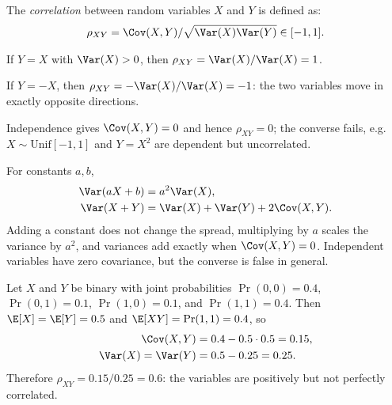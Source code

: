\documentclass[a4paper, 12pt]{book}
\begin{document}
\begin{definition}
    The \emph{correlation} between random variables $X$ and $Y$ is defined as:\begin{align}
    \rho_{XY} = \Cov(X,Y)/\sqrt{\Var(X)\Var(Y)} \in [-1,1].
\end{align}
\end{definition}
\begin{example}
    If $Y=X$ with $\Var(X)>0$, then $\rho_{XY}=\Var(X)/\Var(X)=1$.
\end{example}

\begin{example}
    If $Y=-X$, then $\rho_{XY}=-\Var(X)/\Var(X)=-1$: the two variables move in exactly opposite directions.
\end{example}

\begin{example}
    Independence gives $\Cov(X,Y)=0$ and hence $\rho_{XY}=0$; the converse fails, e.g.\ $X\sim\mathrm{Unif}[-1,1]$ and $Y=X^2$ are dependent but uncorrelated.
\end{example}

\begin{example}
    For constants $a,b$,
    \begin{align}
        \Var(aX+b) &= a^2\Var(X),\\
        \Var(X+Y) &= \Var(X)+\Var(Y)+2\Cov(X,Y).
    \end{align}
    Adding a constant does not change the spread, multiplying by $a$ scales the variance by $a^2$, and variances add exactly when $\Cov(X,Y)=0$. Independent
    variables have zero covariance, but the converse is false in general.
\end{example}

\begin{example}
    Let $X$ and $Y$ be binary with joint probabilities
    $\Pr(0,0)=0.4$, $\Pr(0,1)=0.1$, $\Pr(1,0)=0.1$, and $\Pr(1,1)=0.4$. Then
    $\E[X]=\E[Y]=0.5$ and $\E[XY]=\Pr(1,1)=0.4$, so
    \begin{align}
        \Cov(X,Y) &= 0.4-0.5\cdot0.5 = 0.15,\\
        \Var(X)=\Var(Y) &= 0.5-0.25 = 0.25.
    \end{align}
    Therefore $\rho_{XY}=0.15/0.25=0.6$: the variables are positively but not
    perfectly correlated.
\end{example}
\end{document}
